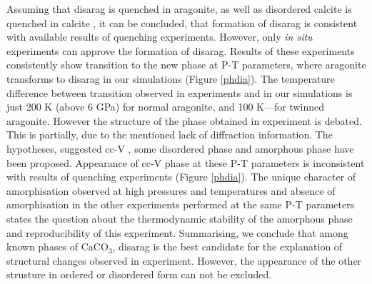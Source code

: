 \documentclass[journal=jacsat,manuscript=article]{achemso}
\begin{document}
Assuming that disarag is quenched in aragonite, as well as disordered calcite is quenched in calcite \cite{ishizawa2013}, it can be concluded, that formation of disarag is consistent with available results of quenching experiments.
However, only {\it in situ} experiments can approve the formation of disarag. 
Results of these experiments consistently show transition to the new phase at P-T parameters, where aragonite transforms to disarag in our simulations (Figure \ref{phdia}). 
The temperature difference between transition observed in experiments  \cite{litasov2017, suito2001} and in our simulations is just 200 K (above 6 GPa) for normal aragonite, and 100 K---for twinned aragonite.
However the structure of the phase obtained in experiment is debated.
This is partially, due to the mentioned lack of diffraction information.
The hypotheses, suggested cc-V \cite{suito2001}, some disordered phase \cite{litasov2017} and amorphous phase \cite{hou2019_amorph} have been proposed.
Appearance of cc-V phase at these P-T parameters is inconsistent with results of quenching experiments (Figure \ref{phdia}).
The unique character of amorphisation observed at high pressures and temperatures and absence of amorphisation in the other experiments performed at the same P-T parameters \cite{litasov2017,suito2001} states the question about the thermodynamic stability of the amorphous phase and  reproducibility of this experiment.
Summarising, we conclude that among known phases of CaCO$_3$, disarag is the best candidate for the explanation of structural changes observed in experiment.
However, the appearance of the other strusture in ordered or disordered form can not be excluded.



\end{document}
